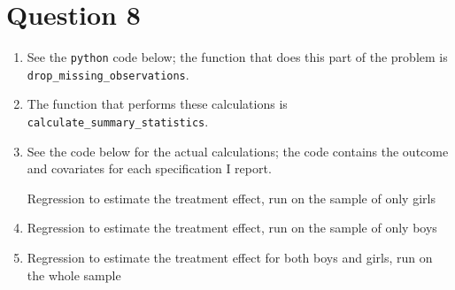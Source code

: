 \documentclass[11pt]{article}
\begin{document}
\section{Question 8}
\label{sec:orgc9af398}
  \begin{enumerate}[label=\alph*)]
\item See the \verb|python| code below; the function that does this part of the problem is \verb|drop_missing_observations|.
\item The function that performs these calculations is \verb|calculate_summary_statistics|. 

\item See the code below for the actual calculations; the code contains the outcome and covariates for each specification I report.

\begin{table}
\caption{Regression to estimate the treatment effect, run on the sample of only girls}

\end{table}

\item

\begin{table}
\caption{Regression to estimate the treatment effect, run on the sample of only boys}

\end{table}

\item 

\begin{table}
\caption{Regression to estimate the treatment effect for both boys and girls, run on the whole sample}

\end{table}


\end{enumerate}
\end{document}
